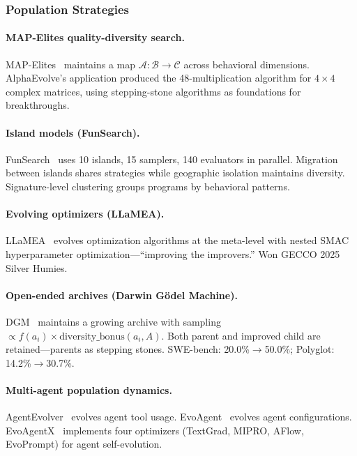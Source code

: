 \subsubsection{Population Strategies}

\paragraph{MAP-Elites quality-diversity search.}
MAP-Elites~\citep{mouret2015mapelites} maintains a map $\mathcal{A}: \mathcal{B} \rightarrow \mathcal{C}$ across behavioral dimensions. AlphaEvolve's application produced the 48-multiplication algorithm for $4\times4$ complex matrices, using stepping-stone algorithms as foundations for breakthroughs.

\paragraph{Island models (FunSearch).}
FunSearch~\citep{romera2024funsearch} uses 10 islands, 15 samplers, 140 evaluators in parallel. Migration between islands shares strategies while geographic isolation maintains diversity. Signature-level clustering groups programs by behavioral patterns.

\paragraph{Evolving optimizers (LLaMEA).}
LLaMEA~\citep{van2024llaMEA} evolves optimization algorithms at the meta-level with nested SMAC hyperparameter optimization---``improving the improvers.'' Won GECCO 2025 Silver Humies.

\paragraph{Open-ended archives (Darwin G\"odel Machine).}
DGM~\citep{zhang2025dgm} maintains a growing archive with sampling $\propto f(a_i) \times \text{diversity\_bonus}(a_i, A)$. Both parent and improved child are retained---parents as stepping stones. SWE-bench: 20.0\%$\rightarrow$50.0\%; Polyglot: 14.2\%$\rightarrow$30.7\%.

\paragraph{Multi-agent population dynamics.}
AgentEvolver~\citep{jiang2024agentevolver} evolves agent tool usage. EvoAgent~\citep{yuan2024evoagent} evolves agent configurations. EvoAgentX~\citep{evoagentx2024} implements four optimizers (TextGrad, MIPRO, AFlow, EvoPrompt) for agent self-evolution.

